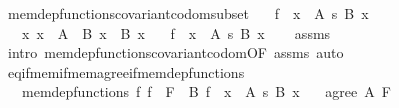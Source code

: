 \begin{isabellebody}
\ mem{\isacharunderscore}{\kern0pt}dep{\isacharunderscore}{\kern0pt}functions{\isacharunderscore}{\kern0pt}covariant{\isacharunderscore}{\kern0pt}codom{\isacharunderscore}{\kern0pt}subset{\isacharcolon}{\kern0pt}\isanewline
\ \ \ {\isachardoublequoteopen}f\ {\isasymin}\ {\isacharparenleft}{\kern0pt}x\ {\isasymin}\ A{\isacharparenright}{\kern0pt}\ {\isasymrightarrow}s\ {\isacharparenleft}{\kern0pt}B\ x{\isacharparenright}{\kern0pt}{\isachardoublequoteclose}\isanewline
\ \ \ {\isachardoublequoteopen}{\isasymAnd}x{\isachardot}{\kern0pt}\ x\ {\isasymin}\ A\ {\isasymLongrightarrow}\ B\ x\ {\isasymsubseteq}\ B{\isacharprime}{\kern0pt}\ x{\isachardoublequoteclose}\isanewline
\ \ \ {\isachardoublequoteopen}f\ {\isasymin}\ {\isacharparenleft}{\kern0pt}x\ {\isasymin}\ A{\isacharparenright}{\kern0pt}\ {\isasymrightarrow}s\ {\isacharparenleft}{\kern0pt}B{\isacharprime}{\kern0pt}\ x{\isacharparenright}{\kern0pt}{\isachardoublequoteclose}\isanewline
%
\isadelimproof
\ \ %
\endisadelimproof
%
\isatagproof
{}\isamarkupfalse%
\ assms{\isacharparenleft}{\kern0pt}{}{\isacharparenright}{\kern0pt}\ \isamarkupfalse%
\ {\isacharparenleft}{\kern0pt}intro\ mem{\isacharunderscore}{\kern0pt}dep{\isacharunderscore}{\kern0pt}functions{\isacharunderscore}{\kern0pt}covariant{\isacharunderscore}{\kern0pt}codom{\isacharbrackleft}{\kern0pt}OF\ assms{\isacharparenleft}{\kern0pt}{}{\isacharparenright}{\kern0pt}{\isacharbrackright}{\kern0pt}{\isacharparenright}{\kern0pt}\ auto%
\endisatagproof
{\isafoldproof}%
%
\isadelimproof
\isanewline
%
\endisadelimproof
\isanewline
{}\isamarkupfalse%
\ eq{\isacharunderscore}{\kern0pt}if{\isacharunderscore}{\kern0pt}mem{\isacharunderscore}{\kern0pt}if{\isacharunderscore}{\kern0pt}mem{\isacharunderscore}{\kern0pt}agree{\isacharunderscore}{\kern0pt}if{\isacharunderscore}{\kern0pt}mem{\isacharunderscore}{\kern0pt}dep{\isacharunderscore}{\kern0pt}functions{\isacharcolon}{\kern0pt}\isanewline
\ \ \ mem{\isacharunderscore}{\kern0pt}dep{\isacharunderscore}{\kern0pt}functions{\isacharcolon}{\kern0pt}\ {\isachardoublequoteopen}{\isasymAnd}f{\isachardot}{\kern0pt}\ f\ {\isasymin}\ F\ {\isasymLongrightarrow}\ {\isasymexists}B{\isachardot}{\kern0pt}\ f\ {\isasymin}\ {\isacharparenleft}{\kern0pt}x\ {\isasymin}\ A{\isacharparenright}{\kern0pt}\ {\isasymrightarrow}s\ {\isacharparenleft}{\kern0pt}B\ x{\isacharparenright}{\kern0pt}{\isachardoublequoteclose}\isanewline
\ \ \ {\isachardoublequoteopen}agree\ A\ F{\isachardoublequoteclose}\isanewline

\end{isabellebody}

